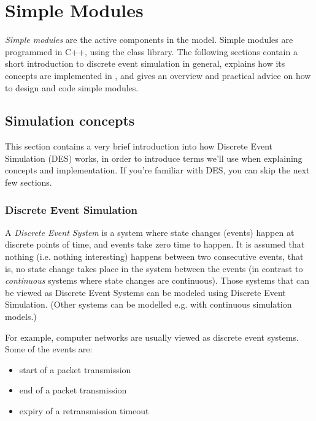 \chapter{Simple Modules}
\label{cha:simple-modules}


\textit{Simple modules} are the active components in the model.
Simple modules are programmed in C++, using the {\opp} class
library. The following sections contain a short introduction
to discrete event simulation in general, explains how its concepts are
implemented in {\opp}, and gives an overview and practical advice
on how to design and code simple modules.



\section{Simulation concepts}

This section contains a very brief introduction into how Discrete
Event Simulation (DES) works, in order to introduce terms we'll use
when explaining {\opp} concepts and
implementation. If you're familiar with DES, you can skip
the next few sections.




\subsection{Discrete Event Simulation}

A \textit{Discrete Event System} is a system where state changes
(events) happen at discrete points of time, and events take zero time
to happen. It is assumed that nothing (i.e. nothing interesting)
happens between two consecutive events, that is, no state change takes
place in the system between the events (in contrast to
\textit{continuous} systems where state changes are continuous). Those
systems that can be viewed as Discrete Event Systems can be modeled
using Discrete Event Simulation.
(Other systems can be modelled e.g. with continuous simulation models.)

For example, computer networks are usually viewed as discrete
event systems. Some of the events are:

\begin{itemize}
  \item{start of a packet transmission}
  \item{end of a packet transmission}
  \item{expiry of a retransmission timeout}
\end{itemize}


